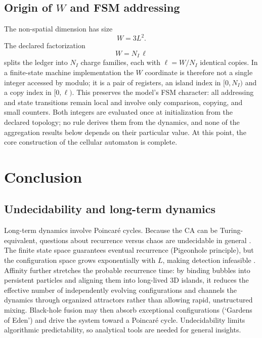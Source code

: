 \documentclass{ijuc}
\begin{document}
\subsection{Origin of $W$ and FSM addressing}
The non-spatial dimension has size
\begin{equation}
W = 3L^2.
\end{equation}
The declared factorization
\begin{equation}
W = N_I\,\ell
\end{equation}
splits the ledger into $N_{I}$ charge families, each with $\ell=W/N_I$ identical copies. In a finite-state machine implementation the $W$ coordinate is therefore not a single integer accessed by modulo; it is a pair of registers, an island index in $[0,N_I)$ and a copy index in $[0,\ell)$. This preserves the model's FSM character: all addressing and state transitions remain local and involve only comparison, copying, and small counters.  Both integers are evaluated once at initialization from the declared topology; no rule derives them from the dynamics, and none of the aggregation results below depends on their particular value.
At this point, the core construction of the cellular automaton is complete.
\section{Conclusion\label{sec:Discussion}}
\subsection{Undecidability and long-term dynamics}\label{sec-undecidability}
Long-term dynamics involve Poincar\'{e} cycles. Because the CA can be Turing-equivalent, questions about recurrence versus chaos are undecidable in general \cite{wolfram1983,gacs1979}. The finite state space guarantees eventual recurrence (Pigeonhole principle), but the configuration space grows exponentially with $L$, making detection infeasible \cite{bernstein2007,toffoli1980}. Affinity further stretches the probable recurrence time: by binding bubbles into persistent particles and aligning them into long-lived 3D islands, it reduces the effective number of independently evolving configurations and channels the dynamics through organized attractors rather than allowing rapid, unstructured mixing. Black-hole fusion may then absorb exceptional configurations (`Gardens of Eden') and drive the system toward a Poincar\'{e} cycle. Undecidability limits algorithmic predictability, so analytical tools are needed for general insights.
\end{document}
